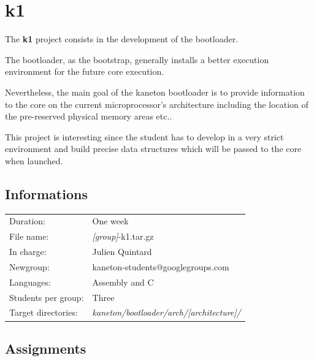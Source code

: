 
%
%

\chapter{k1}

The \textbf{k1} project consists in the development of the bootloader.

The bootloader, as the bootstrap, generally installs a better execution
environment for the future core execution.

Nevertheless, the main goal of the kaneton bootloader is to provide
information to the core on the current microprocessor's architecture
including the location of the pre-reserved physical memory areas etc..

This project is interesting since the student has to develop in a very
strict environment and build precise data structures which will be passed
to the core when launched.

\newpage

%
%

\section{Informations}

\begin{tabular}{p{7cm}l}
Duration: & One week \\
File name: & \textit{[group]}-k1.tar.gz \\
In charge: & Julien Quintard \\
Newgroup: & kaneton-students@googlegroups.com \\
Languages: & Assembly and C \\
Students per group: & Three \\
Target directories: & \textit{kaneton/bootloader/arch/[architecture]/} \\
\end{tabular}

%
%

\section{Assignments}

